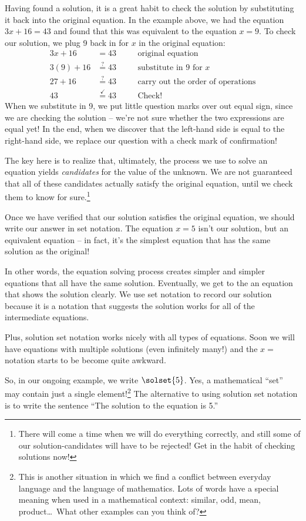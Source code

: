 Having found a solution, it is a great habit to check the solution by substituting it back into the original equation. In the example above, we had the equation $3x+16=43$ and found that this was equivalent to the equation $x=9$. To check our solution, we plug 9 back in for $x$ in the original equation:
\[\begin{aligned}
3x + 16 & = 43
&&\quad\text{original equation}\\
3(9) + 16 & \overset{?}{=} 43
&&\quad\text{substitute in 9 for $x$}\\
27 + 16 & \overset{?}{=} 43
&&\quad\text{carry out the order of operations}\\
43 & \overset{\checkmark}{=} 43
&&\quad\text{Check!}
\end{aligned}\]
When we substitute in 9, we put little question marks over out equal sign, since we are checking the solution -- we're not sure whether the two expressions are equal yet! In the end, when we discover that the left-hand side is equal to the right-hand side, we replace our question with a check mark of confirmation!

The key here is to realize that, ultimately, the process we use to solve an equation yields \textit{candidates} for the value of the unknown. We are not guaranteed that all of these candidates actually satisfy the original equation, until we check them to know for sure.\footnote{There will come a time when we will do everything correctly, and still some of our solution-candidates will have to be rejected! Get in the habit of checking solutions now!}

Once we have verified that our solution satisfies the original equation, we should write our answer in set notation. The equation $x=5$ isn't our solution, but an equivalent equation -- in fact, it's the simplest equation that has the same solution as the original!

In other words, the equation solving process creates simpler and simpler equations that all have the same solution. Eventually, we get to the an equation that shows the solution clearly. We use set notation to record our solution because it is a notation that suggests the solution works for all of the intermediate equations.

Plus, solution set notation works nicely with all types of equations. Soon we will have equations with multiple solutions (even infinitely many!) and the $x=$ notation starts to be become quite awkward.

So, in our ongoing example, we write $\solset{5}$. Yes, a mathematical ``set'' may contain just a single element!\footnote{This is another situation in which we find a conflict between everyday language and the language of mathematics. Lots of words have a special meaning when used in a mathematical context: similar, odd, mean, product\ldots\ What other examples can you think of?} The alternative to using solution set notation is to write the sentence ``The solution to the equation is 5.''


